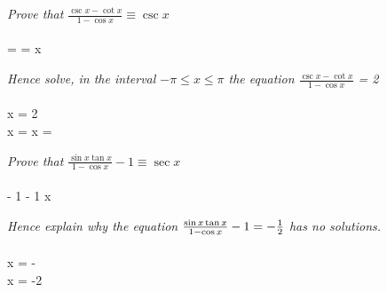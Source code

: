 \documentclass{../../main}
\begin{document}
	
	\question
	
	\begin{arr}[a]
		\textit{Prove that $\frac{\csc x - \cot x}{1 - \cos x} \equiv \csc x$} \\ \\

		 \equiv {} =  \equiv {} = \csc x
	\end{arr}

	\begin{arr}[b]
		\textit{Hence solve, in the interval $-\pi \leq x \leq \pi$ the equation $\frac{\csc x - \cot x}{1 - \cos x}$ = 2} \\ \\

		\csc x = 2 \\
		\therefore \sin x =  \quad \therefore x =  \pi \rad \\
	\end{arr}

	
	\question
	
	\begin{arr}[a]
		\textit{Prove that $\frac{\sin x \tan x}{1 - \cos x} - 1 \equiv \sec x$} \\ \\

		 - 1 \equiv {} - 1 \equiv {} \equiv {} \equiv {} \equiv \sec x
	\end{arr}

	\begin{arr}[b]
		\textit{Hence explain why the equation $\frac{\sin x \tan x}{1 - \cos x} - 1 = -\frac{1}{2}$ has no solutions.} \\ \\

		\sec x = - \\
		\Rightarrow \cos x = -2 \\
	\end{arr}
\end{document}
